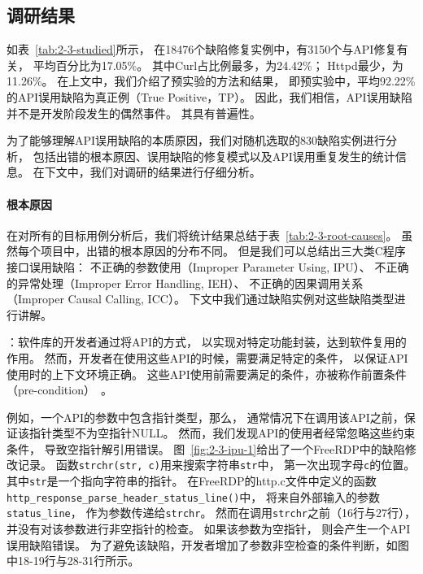
\subsection{调研结果}
如表~\ref{tab:2-3-studied}所示，
在18476个缺陷修复实例中，有3150个与API修复有关，
平均百分比为17.05\%。
其中Curl占比例最多，为24.42\%；
Httpd最少，为11.26\%。
在上文中，我们介绍了预实验的方法和结果，
即预实验中，平均92.22\%的API误用缺陷为真正例（True Positive，TP）。
因此，我们相信，API误用缺陷并不是开发阶段发生的偶然事件。
其具有普遍性。

\vspace*{10pt}
\begin{center}
\noindent{}
\end{center}

为了能够理解API误用缺陷的本质原因，我们对随机选取的830缺陷实例进行分析，
包括出错的根本原因、误用缺陷的修复模式以及API误用重复发生的统计信息。
在下文中，我们对调研的结果进行仔细分析。

\paragraph{根本原因}

在对所有的目标用例分析后，我们将统计结果总结于表~\ref{tab:2-3-root-causes}。
虽然每个项目中，出错的根本原因的分布不同。
但是我们可以总结出三大类C程序接口误用缺陷：
不正确的参数使用（Improper Parameter Using, IPU）、
不正确的异常处理（Improper Error Handling, IEH）、
不正确的因果调用关系（Improper Causal Calling, ICC）。
下文中我们通过缺陷实例对这些缺陷类型进行讲解。



\vspace*{10pt}
：软件库的开发者通过将API的方式，
以实现对特定功能封装，达到软件复用的作用。
然而，开发者在使用这些API的时候，需要满足特定的条件，
以保证API使用时的上下文环境正确。
这些API使用前需要满足的条件，亦被称作前置条件（pre-condition）~\cite{14-fse-pre}。

例如，一个API的参数中包含指针类型，那么，
通常情况下在调用该API之前，保证该指针类型不为空指针NULL。
然而，我们发现API的使用者经常忽略这些约束条件，
导致空指针解引用错误。
图~\ref{fig:2-3-ipu-1}给出了一个FreeRDP中的缺陷修改记录。
函数\texttt{strchr(str, c)}用来搜索字符串\texttt{str}中，
第一次出现字母\texttt{c}的位置。
其中\texttt{str}是一个指向字符串的指针。
在FreeRDP的http.c文件中定义的函数\texttt{http\_response\_parse\_header\_status\_line()}中，
将来自外部输入的参数\texttt{status\_line}，
作为参数传递给\texttt{strchr}。
然而在调用\texttt{strchr}之前（16行与27行），并没有对该参数进行非空指针的检查。
如果该参数为空指针，
则会产生一个API误用缺陷错误。
为了避免该缺陷，开发者增加了参数非空检查的条件判断，如图中18-19行与28-31行所示。


